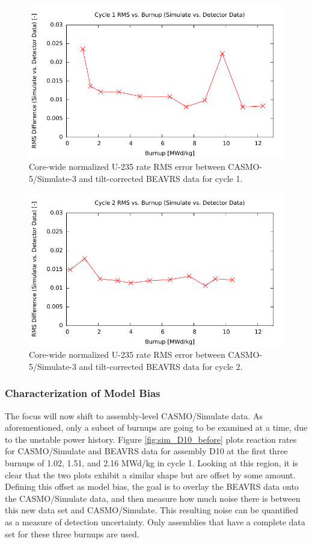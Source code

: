 \documentclass{article}
\begin{document}
\begin{figure}[!htb]
\centering
\includegraphics[keepaspectratio, width = 4.5 in]{figures/sim_rms_cyc1}
\caption{Core-wide normalized U-235 rate RMS error between CASMO-5/Simulate-3 and tilt-corrected BEAVRS data for cycle 1.}
\label{fig:lm_cyc1_rms}
\end{figure}

\begin{figure}[!htb]
\centering
\includegraphics[keepaspectratio, width = 4.5 in]{figures/sim_rms_cyc2}
\caption{Core-wide normalized U-235 rate RMS error between CASMO-5/Simulate-3 and tilt-corrected BEAVRS data for cycle 2.}
\label{fig:lm_cyc2_rms}
\end{figure}

\subsubsection{Characterization of Model Bias}\label{sec:modelbias_char}

The focus will now shift to assembly-level CASMO/Simulate data. As aforementioned, only a subset of burnups are going to be examined at a time, due to the unstable power history. Figure \ref{fig:sim_D10_before} plots reaction rates for CASMO/Simulate and BEAVRS data for assembly D10 at the first three burnups of 1.02, 1.51, and 2.16 MWd/kg in cycle 1. Looking at this region, it is clear that the two plots exhibit a similar shape but are offset by some amount. Defining this offset as model bias, the goal is to overlay the BEAVRS data onto the CASMO/Simulate data, and then measure how much noise there is between this new data set and CASMO/Simulate. This resulting noise can be quantified as a measure of detection uncertainty. Only assemblies that have a complete data set for these three burnups are used.
\end{document}
